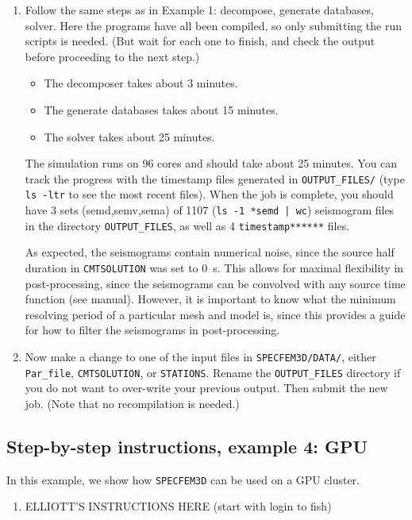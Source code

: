 \documentclass[10pt,fleqn,letterpaper]{article}
\begin{document}
\begin{enumerate}
\item Follow the same steps as in Example 1: decompose, generate databases, solver. Here the programs have all been compiled, so only submitting the run scripts is needed. (But wait for each one to finish, and check the output before proceeding to the next step.)
%
\begin{itemize}
\item The decomposer takes about 3 minutes.
\item The generate databases takes about 15 minutes.
\item The solver takes about 25 minutes.
\end{itemize}
%
The simulation runs on 96 cores and should take about 25 minutes. You can track the progress with the timestamp files generated in \verb+OUTPUT_FILES/+ (type \verb+ls -ltr+ to see the most recent files). When the job is complete, you should have 3 sets (semd,semv,sema) of 1107 (\verb+ls -1 *semd | wc+) seismogram files in the directory \verb+OUTPUT_FILES+, as well as 4 \verb+timestamp******+ files.

As expected, the seismograms contain numerical noise, since the source half duration in \verb+CMTSOLUTION+ was set to 0~s. This allows for maximal flexibility in post-processing, since the seismograms can be convolved with any source time function (see manual). However, it is important to know what the minimum resolving period of a particular mesh and model is, since this provides a guide for how to filter the seismograms in post-processing.

\item Now make a change to one of the input files in \verb+SPECFEM3D/DATA/+, either \verb+Par_file+, \verb+CMTSOLUTION+, or \verb+STATIONS+. Rename the \verb+OUTPUT_FILES+ directory if you do not want to over-write your previous output. Then submit the new job. (Note that no recompilation is needed.)

\end{enumerate}


\subsection*{Step-by-step instructions, example 4: GPU}

In this example, we show how \verb+SPECFEM3D+ can be used on a GPU cluster.

\begin{enumerate}
\item ELLIOTT'S INSTRUCTIONS HERE (start with login to fish)
\end{enumerate}


%
%

\end{document}
